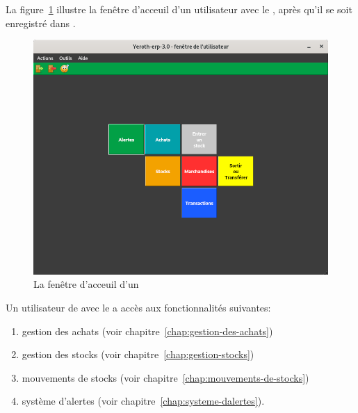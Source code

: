 \label{sec:utilisateurs-gestionairedestocks}

La figure~\ref{fig:yeren-fenetre-gestionairedestocks} illustre
la fen\^etre d'acceuil d'un utilisateur avec le \role \gestionairedestocks, 
apr\`es qu'il se soit enregistr\'e dans \yeroth.\\

\begin{figure}[!htbp]
\centering
\includegraphics[scale=0.63]{images/yeren-fenetre-gestionairedestocks.png}
\caption{La fen\^etre d'acceuil d'un \gestionairedestocks}
\label{fig:yeren-fenetre-gestionairedestocks}
\end{figure}

Un utilisateur de \yeroth avec le \role \gestionairedestocks a acc\`es
aux fonctionnalit\'es suivantes:

\begin{enumerate}[1)]
	\item gestion des achats (voir chapitre~\ref{chap:gestion-des-achats})
	\item gestion des stocks (voir chapitre~\ref{chap:gestion-stocks})
	\item mouvements de stocks (voir chapitre~\ref{chap:mouvements-de-stocks})	
	\item syst\`eme d'alertes (voir chapitre~\ref{chap:systeme-dalertes}).\\
\end{enumerate}
